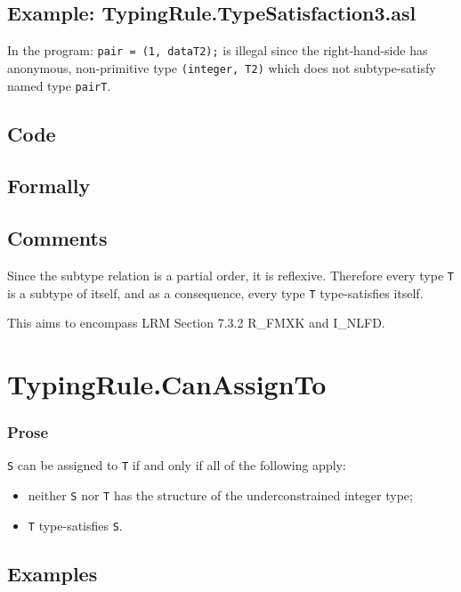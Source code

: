 \documentclass{book}
\begin{document}
\subsection{Example: TypingRule.TypeSatisfaction3.asl}
    In the program:
    \texttt{pair = (1, dataT2);} is illegal since the right-hand-side has anonymous,
    non-primitive type \texttt{(integer, T2)} which does not subtype-satisfy named
    type \texttt{pairT}.

  \subsection{Code}

  \subsection{Formally}

  \subsection{Comments}
  Since the subtype relation is a partial order, it is reflexive. Therefore
  every type \texttt{T} is a subtype of itself, and as a consequence, every type \texttt{T}
  type-satisfies itself.
  
  This aims to encompass LRM Section 7.3.2 R\_FMXK and I\_NLFD.

\section{TypingRule.CanAssignTo \label{sec:TypingRule.CanAssignTo}}

  \subsubsection{Prose}
  \texttt{S} can be assigned to \texttt{T} if and only if all of the following apply:
  \begin{itemize}
  \item neither \texttt{S} nor \texttt{T} has the structure of the underconstrained integer type;
  \item \texttt{T} type-satisfies \texttt{S}.
  \end{itemize} 
 
  \subsection{Examples}
\end{document}
